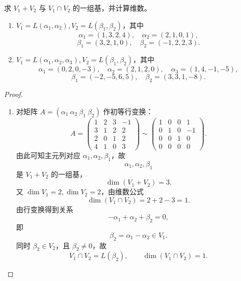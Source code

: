\begin{problem}
	求 $V_1+V_2$ 与 $V_1\cap V_2$ 的一组基，并计算维数。
	\begin{enumerate}
		\item $V_1=L(\alpha_1,\alpha_2),V_2=L(\beta_1,\beta_2)$，其中
		\[
		\alpha_1=(1,3,2,4),\quad
		\alpha_2=(2,1,0,1),
		\]
		\[
		\beta_1=(3,2,1,0),\quad
		\beta_2=(-1,2,2,3).
		\]
		\item $V_1=L(\alpha_1,\alpha_2,\alpha_3),V_2=L(\beta_1,\beta_2)$，其中
		\[
		\alpha_1=(0,2,0,-3),
		\quad
		\alpha_2=(2,1,2,0),
		\quad
		\alpha_3=(1,4,-1,-5),
		\]
		\[
		\beta_1=(-2,-5,6,5),
		\quad
		\beta_2=(3,3,1,-8).
		\]
	\end{enumerate}
\end{problem}

\begin{proof}
	\begin{enumerate}
		\item 对矩阵 $A=(\alpha_1\ \alpha_2\ \beta_1\ \beta_2)$ 作初等行变换：
		\[
		A=
		\begin{pmatrix}
			1&2&3&-1\\
			3&1&2&2\\
			2&0&1&2\\
			4&1&0&3
		\end{pmatrix}
		\sim
		\begin{pmatrix}
			1&0&0&1\\
			0&1&0&-1\\
			0&0&1&0\\
			0&0&0&0
		\end{pmatrix}.
		\]
		由此可知主元列对应 $\alpha_1,\alpha_2,\beta_1$，故
		\[
		\alpha_1,\alpha_2,\beta_1
		\]
		是 $V_1+V_2$ 的一组基，
		\[
		\dim(V_1+V_2)=3.
		\]
		又 $\dim V_1=2,\dim V_2=2$，由维数公式
		\[
		\dim(V_1\cap V_2)=2+2-3=1.
		\]
		由行变换得到关系
		\[
		-\alpha_1+\alpha_2+\beta_2=0,
		\]
		即
		\[
		\beta_2=\alpha_1-\alpha_2\in V_1.
		\]
		同时 $\beta_2\in V_2$，且 $\beta_2\neq0$，故
		\[
		V_1\cap V_2=L(\beta_2),
		\qquad
		\dim(V_1\cap V_2)=1.
		\]
		

\end{enumerate}
\end{proof}
